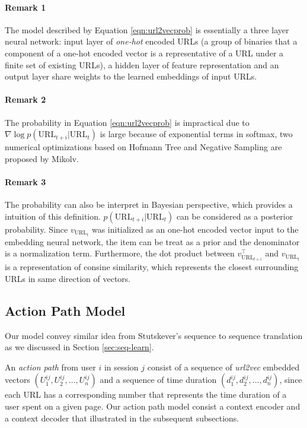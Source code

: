 \paragraph{Remark 1} The model described by Equation \ref{eqn:url2vecprob} is essentially
a three layer neural network: input layer of \emph{one-hot} encoded URLs (a group of binaries
that a component of a one-hot encoded vector is a representative of a URL under a finite set
of existing URLs), a hidden layer of feature representation and an output layer 
share weights to the learned embeddings of input URLs.

\paragraph{Remark 2} The probability in Equation \ref{eqn:url2vecprob} is impractical due to
$\nabla \log{p(\text{URL}_{t+i} | \text{URL}_t)}$ is large because of exponential terms in softmax,
two numerical optimizations \cite{mikolv2013embedding} based on Hofmann Tree and Negative Sampling
are proposed by Mikolv.

\paragraph{Remark 3} The probability can also be interpret in Bayesian perspective,
which provides a intuition of this definition. $p(\text{URL}_{t+i} | \text{URL}_t)$
can be considered as a posterior probability. Since $v_{\text{URL}_t}$ was initialized
as an one-hot encoded vector input to the embedding neural network, the item can be treat
as a prior and the denominator is a normalization term.
Furthermore, the dot product between $v_{\text{URL}_{t+i}} ^\top$
and $v_{\text{URL}_t}$ is a representation of consine similarity, which represents
the closest surrounding URLs in same direction of vectors.

\subsection{Action Path Model}

Our model convey similar idea from Stutskever's sequence 
to sequence translation as we discussed in Section \ref{sec:seq-learn}.

An \emph{action path} from user $i$ in session $j$ consist of 
a sequence of \emph{url2vec} embedded vectors $(U^{ij}_1, U^{ij}_2, ..., U^{ij}_n)$ 
and a sequence of time duration $(d^{ij}_1, d^{ij}_2, ..., d^{ij}_n)$, since each URL 
has a corresponding number that represents the time duration of a user spent on a given page.
Our action path model consist a context encoder and a context decoder that illustrated in the subsequent
subsections.

